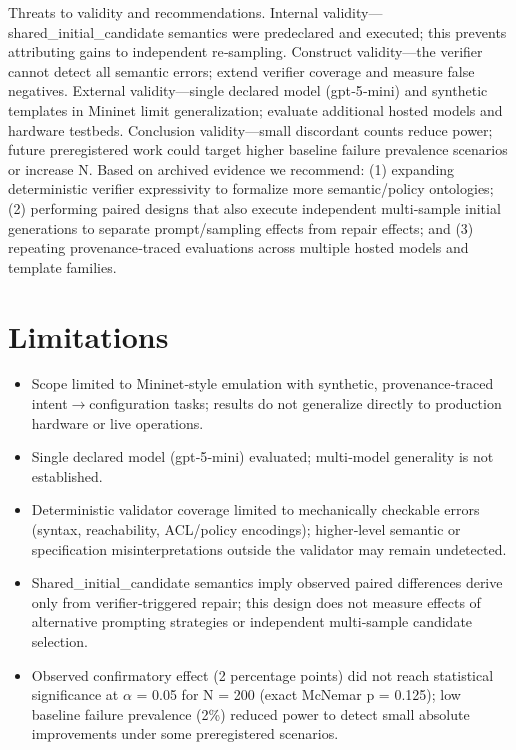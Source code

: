 \documentclass[conference]{IEEEtran}
\begin{document}
Threats to validity and recommendations. Internal validity---shared\_initial\_candidate semantics were predeclared and executed; this prevents attributing gains to independent re‑sampling. Construct validity---the verifier cannot detect all semantic errors; extend verifier coverage and measure false negatives. External validity---single declared model (gpt‑5‑mini) and synthetic templates in Mininet limit generalization; evaluate additional hosted models and hardware testbeds. Conclusion validity---small discordant counts reduce power; future preregistered work could target higher baseline failure prevalence scenarios or increase N. Based on archived evidence we recommend: (1) expanding deterministic verifier expressivity to formalize more semantic/policy ontologies; (2) performing paired designs that also execute independent multi‑sample initial generations to separate prompt/sampling effects from repair effects; and (3) repeating provenance‑traced evaluations across multiple hosted models and template families.

\section{Limitations}
\begin{itemize}
\item Scope limited to Mininet‑style emulation with synthetic, provenance‑traced intent\ensuremath{\rightarrow}configuration tasks; results do not generalize directly to production hardware or live operations.
\item Single declared model (gpt‑5‑mini) evaluated; multi‑model generality is not established.
\item Deterministic validator coverage limited to mechanically checkable errors (syntax, reachability, ACL/policy encodings); higher‑level semantic or specification misinterpretations outside the validator may remain undetected.
\item Shared\_initial\_candidate semantics imply observed paired differences derive only from verifier‑triggered repair; this design does not measure effects of alternative prompting strategies or independent multi‑sample candidate selection.
\item Observed confirmatory effect (2 percentage points) did not reach statistical significance at \ensuremath{\alpha} = 0.05 for N = 200 (exact McNemar p = 0.125); low baseline failure prevalence (2\%) reduced power to detect small absolute improvements under some preregistered scenarios.
\end{itemize}
\end{document}
